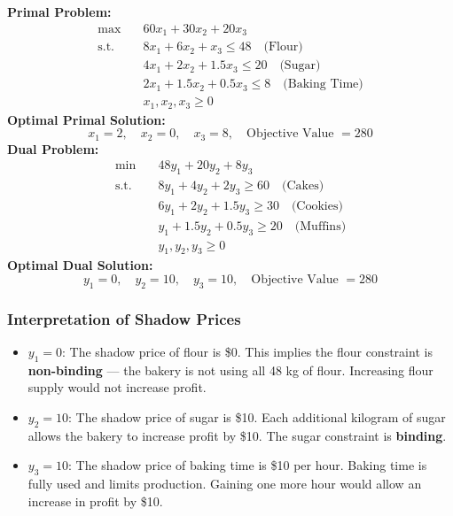 \vspace{1em}
\noindent\textbf{Primal Problem:}
$$
\begin{aligned}
\max\quad & 60x_1 + 30x_2 + 20x_3 \\
\text{s.t.} \quad
& 8x_1 + 6x_2 + x_3 \leq 48 \quad \text{(Flour)} \\
& 4x_1 + 2x_2 + 1.5x_3 \leq 20 \quad \text{(Sugar)} \\
& 2x_1 + 1.5x_2 + 0.5x_3 \leq 8 \quad \text{(Baking Time)} \\
& x_1, x_2, x_3 \geq 0
\end{aligned}
$$
\textbf{Optimal Primal Solution:}
$$
x_1 = 2,\quad x_2 = 0,\quad x_3 = 8,\quad \text{Objective Value } = 280
$$
\vspace{1em}
\noindent\textbf{Dual Problem:}
$$
\begin{aligned}
\min\quad & 48y_1 + 20y_2 + 8y_3 \\
\text{s.t.} \quad
& 8y_1 + 4y_2 + 2y_3 \geq 60 \quad \text{(Cakes)} \\
& 6y_1 + 2y_2 + 1.5y_3 \geq 30 \quad \text{(Cookies)} \\
& y_1 + 1.5y_2 + 0.5y_3 \geq 20 \quad \text{(Muffins)} \\
& y_1, y_2, y_3 \geq 0
\end{aligned}
$$
\textbf{Optimal Dual Solution:}
$$
y_1 = 0,\quad y_2 = 10,\quad y_3 = 10,\quad \text{Objective Value } = 280
$$

\vspace{1em}
\subsubsection*{Interpretation of Shadow Prices}
\begin{itemize}
\item $y_1 = 0$: The shadow price of flour is \$0.
This implies the flour constraint is \textbf{non-binding} — the bakery is not using all 48 kg of flour. Increasing flour supply would not increase profit.

\item $y_2 = 10$: The shadow price of sugar is \$10.
Each additional kilogram of sugar allows the bakery to increase profit by \$10. The sugar constraint is \textbf{binding}.

\item $y_3 = 10$: The shadow price of baking time is \$10 per hour.
Baking time is fully used and limits production. Gaining one more hour would allow an increase in profit by \$10.
\end{itemize}

